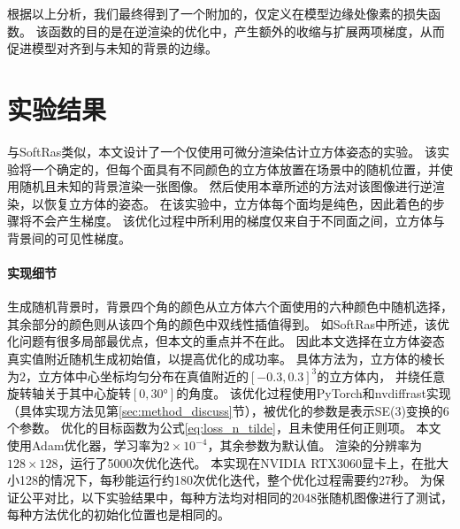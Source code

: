 根据以上分析，我们最终得到了一个附加的，仅定义在模型边缘处像素的损失函数。
该函数的目的是在逆渲染的优化中，产生额外的收缩与扩展两项梯度，从而促进模型对齐到与未知的背景的边缘。

\section{实验结果}

与SoftRas\citep{softras}类似，本文设计了一个仅使用可微分渲染估计立方体姿态的实验。
该实验将一个确定的，但每个面具有不同颜色的立方体放置在场景中的随机位置，并使用随机且未知的背景渲染一张图像。
然后使用本章所述的方法对该图像进行逆渲染，以恢复立方体的姿态。
在该实验中，立方体每个面均是纯色，因此着色的步骤将不会产生梯度。
该优化过程中所利用的梯度仅来自于不同面之间，立方体与背景间的可见性梯度。

\paragraph{实现细节}
生成随机背景时，背景四个角的颜色从立方体六个面使用的六种颜色中随机选择，
其余部分的颜色则从该四个角的颜色中双线性插值得到。
如SoftRas中所述，该优化问题有很多局部最优点，但本文的重点并不在此。
因此本文选择在立方体姿态真实值附近随机生成初始值，以提高优化的成功率。
具体方法为，立方体的棱长为$2$，立方体中心坐标均匀分布在真值附近的$[-0.3,0.3]^3$的立方体内，
并绕任意旋转轴关于其中心旋转$[0,30°]$的角度。
该优化过程使用PyTorch\citep{pytorch}和nvdiffrast实现（具体实现方法见第\ref{sec:method_discuss}节），被优化的参数是表示SE(3)变换的6个参数。
优化的目标函数为公式\eqref{eq:loss_n_tilde}，且未使用任何正则项。
本文使用Adam\citep{adam}优化器，学习率为$2\times 10^{-4}$，其余参数为默认值。
渲染的分辨率为$128\times128$，运行了5000次优化迭代。
本实现在NVIDIA RTX3060显卡上，在批大小128的情况下，每秒能运行约180次优化迭代，整个优化过程需要约27秒。
为保证公平对比，以下实验结果中，每种方法均对相同的2048张随机图像进行了测试，每种方法优化的初始化位置也是相同的。

